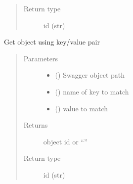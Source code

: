 \documentclass[letterpaper,10pt,english]{sphinxmanual}
\begin{document}
\begin{fulllineitems}
\begin{fulllineitems}
\begin{quote}
\begin{description}
\item[{Return type}] \leavevmode
\sphinxAtStartPar
id (str)

\end{description}\end{quote}

\end{fulllineitems}


\begin{fulllineitems}
\label{\detokenize{b1cdc-class:bloxone.b1cdc.get_object_by_key}}
\sphinxAtStartPar
Get object using key/value pair
\begin{quote}\begin{description}
\item[{Parameters}] \leavevmode\begin{itemize}
\item {} 
\sphinxAtStartPar
{} () \textendash{} Swagger object path

\item {} 
\sphinxAtStartPar
{} () \textendash{} name of key to match

\item {} 
\sphinxAtStartPar
{} () \textendash{} value to match

\end{itemize}

\item[{Returns}] \leavevmode
\sphinxAtStartPar
object id or “”

\item[{Return type}] \leavevmode
\sphinxAtStartPar
id (str)

\end{description}\end{quote}


\end{fulllineitems}
\end{fulllineitems}
\end{document}
